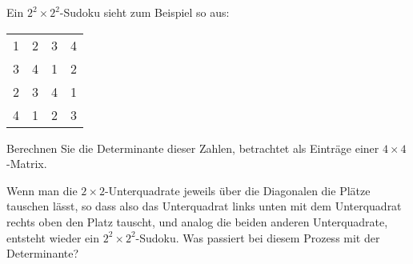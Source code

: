 Ein $2^2\times 2^2$-Sudoku sieht zum Beispiel so aus:
\begin{center}
\begin{tabular}{|cc|cc|}
\hline
1&2&3&4\\
3&4&1&2\\
\hline
2&3&4&1\\
4&1&2&3\\
\hline
\end{tabular}
\end{center}
\begin{teilaufgaben}
\item Berechnen Sie die Determinante dieser Zahlen, betrachtet
als Einträge einer $4\times 4$-Matrix.
\item Wenn man die $2\times 2$-Unterquadrate jeweils über die Diagonalen
die Plätze tauschen lässt, so dass also das Unterquadrat links unten
mit dem Unterquadrat rechts oben den Platz tauscht, und analog die beiden
anderen Unterquadrate, entsteht wieder ein $2^2\times 2^2$-Sudoku.
Was passiert bei diesem Prozess mit der  Determinante?
\end{teilaufgaben}


